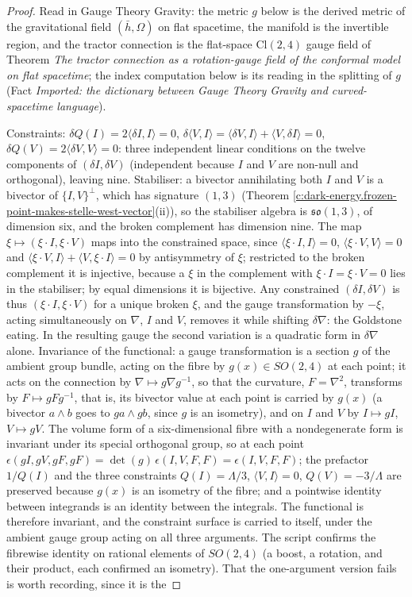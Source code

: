 \documentclass[11pt]{article}
\theoremstyle{definition}
\theoremstyle{plain}
\providecommand{\Cl}{}\renewcommand{\Cl}{\mathrm{Cl}}
\providecommand{\hb}{}\renewcommand{\hb}{\bar{h}}
\providecommand{\ip}{}\renewcommand{\ip}[2]{\langle #1, #2\rangle}
\begin{document}
\begin{proof}
Read in Gauge Theory Gravity: the metric $g$ below is the derived metric of the gravitational field $(\hb, \Omega)$ on flat spacetime, the manifold is the invertible region, and the tractor connection is the flat-space $\Cl(2,4)$ gauge field of Theorem \emph{The tractor connection as a rotation-gauge field of the conformal model on flat spacetime}; the index computation below is its reading in the splitting of $g$ (Fact \emph{Imported: the dictionary between Gauge Theory Gravity and curved-spacetime language}).

Constraints: $\delta Q(I) = 2\ip{\delta I}{I} = 0$, $\delta\ip{V}{I} = \ip{\delta V}{I} + \ip{V}{\delta I} = 0$, $\delta Q(V) = 2\ip{\delta V}{V} = 0$: three independent linear conditions on the twelve components of $(\delta I, \delta V)$ (independent because $I$ and $V$ are non-null and orthogonal), leaving nine. Stabiliser: a bivector annihilating both $I$ and $V$ is a bivector of $\{I,V\}^\perp$, which has signature $(1,3)$ (Theorem \ref{c:dark-energy.frozen-point-makes-stelle-west-vector}(ii)), so the stabiliser algebra is $\mathfrak{so}(1,3)$, of dimension six, and the broken complement has dimension nine. The map $\xi \mapsto (\xi\cdot I, \xi\cdot V)$ maps into the constrained space, since $\ip{\xi\cdot I}{I} = 0$, $\ip{\xi\cdot V}{V} = 0$ and $\ip{\xi\cdot V}{I} + \ip{V}{\xi\cdot I} = 0$ by antisymmetry of $\xi$; restricted to the broken complement it is injective, because a $\xi$ in the complement with $\xi\cdot I = \xi\cdot V = 0$ lies in the stabiliser; by equal dimensions it is bijective. Any constrained $(\delta I, \delta V)$ is thus $(\xi\cdot I, \xi\cdot V)$ for a unique broken $\xi$, and the gauge transformation by $-\xi$, acting simultaneously on $\nabla$, $I$ and $V$, removes it while shifting $\delta\nabla$: the Goldstone eating. In the resulting gauge the second variation is a quadratic form in $\delta\nabla$ alone. Invariance of the functional: a gauge transformation is a section $g$ of the ambient group bundle, acting on the fibre by $g(x) \in SO(2,4)$ at each point; it acts on the connection by $\nabla \mapsto g\nabla g^{-1}$, so that the curvature, $F = \nabla^2$, transforms by $F \mapsto gFg^{-1}$, that is, its bivector value at each point is carried by $g(x)$ (a bivector $a\wedge b$ goes to $ga\wedge gb$, since $g$ is an isometry), and on $I$ and $V$ by $I \mapsto gI$, $V \mapsto gV$. The volume form of a six-dimensional fibre with a nondegenerate form is invariant under its special orthogonal group, so at each point $\epsilon(gI, gV, gF, gF) = \det(g)\,\epsilon(I, V, F, F) = \epsilon(I, V, F, F)$; the prefactor $1/Q(I)$ and the three constraints $Q(I) = \Lambda/3$, $\ip{V}{I} = 0$, $Q(V) = -3/\Lambda$ are preserved because $g(x)$ is an isometry of the fibre; and a pointwise identity between integrands is an identity between the integrals. The functional is therefore invariant, and the constraint surface is carried to itself, under the ambient gauge group acting on all three arguments. The script confirms the fibrewise identity on rational elements of $SO(2,4)$ (a boost, a rotation, and their product, each confirmed an isometry). That the one-argument version fails is worth recording, since it is the 
\end{proof}
\end{document}
